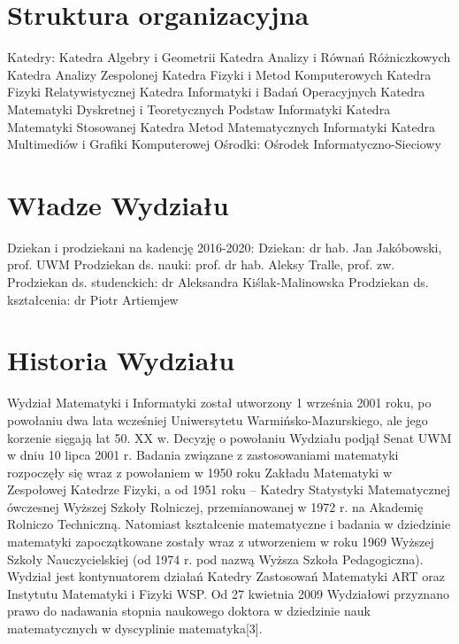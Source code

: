 \documentclass[a4paper,12pt]{article}
\begin{document}
\section{Struktura organizacyjna}\label{sec:}
Katedry:
Katedra Algebry i Geometrii
Katedra Analizy i Równań Różniczkowych
Katedra Analizy Zespolonej
Katedra Fizyki i Metod Komputerowych
Katedra Fizyki Relatywistycznej
Katedra Informatyki i Badań Operacyjnych
Katedra Matematyki Dyskretnej i Teoretycznych Podstaw Informatyki
Katedra Matematyki Stosowanej
Katedra Metod Matematycznych Informatyki
Katedra Multimediów i Grafiki Komputerowej
Ośrodki:
Ośrodek Informatyczno-Sieciowy
\section{Władze Wydziału}\label{sec:}
Dziekan i prodziekani na kadencję 2016-2020:
Dziekan: dr hab. Jan Jakóbowski, prof. UWM
Prodziekan ds. nauki: prof. dr hab. Aleksy Tralle, prof. zw.
Prodziekan ds. studenckich: dr Aleksandra Kiślak-Malinowska
Prodziekan ds. kształcenia: dr Piotr Artiemjew
\section{Historia Wydziału}\label{sec:}
Wydział Matematyki i Informatyki został utworzony 1 września 2001 roku, po powołaniu dwa lata wcześniej
Uniwersytetu Warmińsko-Mazurskiego, ale jego korzenie sięgają lat 50. XX w. Decyzję o powołaniu Wydziału
podjął Senat UWM w dniu 10 lipca 2001 r. Badania związane z zastosowaniami matematyki rozpoczęły się
wraz z powołaniem w 1950 roku Zakładu Matematyki w Zespołowej Katedrze Fizyki, a od 1951 roku –
Katedry Statystyki Matematycznej ówczesnej Wyższej Szkoły Rolniczej, przemianowanej w 1972 r. na
Akademię Rolniczo Techniczną. Natomiast kształcenie matematyczne i badania w dziedzinie matematyki
zapoczątkowane zostały wraz z utworzeniem w roku 1969 Wyższej Szkoły Nauczycielskiej (od 1974 r. pod
nazwą Wyższa Szkoła Pedagogiczna). Wydział jest kontynuatorem działań Katedry Zastosowań Matematyki
ART oraz Instytutu Matematyki i Fizyki WSP.
Od 27 kwietnia 2009 Wydziałowi przyznano prawo do nadawania stopnia naukowego doktora w dziedzinie
nauk matematycznych w dyscyplinie matematyka[3].
\end{document}
